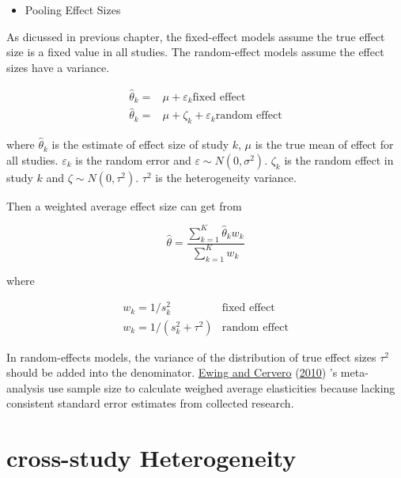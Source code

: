 \documentclass[
  11pt,
  openany]{memoir}
\providecommand{\tightlist}{%
  \setlength{\itemsep}{0pt}\setlength{\parskip}{0pt}}
\begin{document}
\begin{itemize}
\tightlist
\item
  Pooling Effect Sizes
\end{itemize}

As dicussed in previous chapter, the fixed-effect models assume the true effect size is a fixed value in all studies.
The random-effect models assume the effect sizes have a variance.

\begin{equation}
\begin{split}
\hat\theta_k =& \mu  + \varepsilon_k \text{fixed effect}\\
\hat\theta_k =& \mu + \zeta_k + \varepsilon_k \text{random effect}
\end{split}
\label{eq:fixran}
\end{equation}

where \(\hat\theta_k\) is the estimate of effect size of study \(k\), \(\mu\) is the true mean of effect for all studies. \(\varepsilon_k\) is the random error and \(\varepsilon\sim N(0,\sigma^2)\).
\(\zeta_k\) is the random effect in study \(k\) and \(\zeta\sim N(0,\tau^2)\). \(\tau^2\) is the heterogeneity variance.

Then a weighted average effect size can get from

\begin{equation}
\hat\theta = \frac{\sum^{K}_{k=1} \hat\theta_kw_k}{\sum^{K}_{k=1} w_k}
\end{equation}

where

\begin{equation}
\begin{split}
w_k = 1/s^2_k &\text{fixed effect}\\
w_k = 1/(s^2_k+\tau^2) &\text{random effect}
\end{split}
\label{eq:weight}
\end{equation}

In random-effects models, the variance of the distribution of true effect sizes \(\tau^2\) should be added into the denominator.
\protect\hyperlink{ref-ewingTravelBuiltEnvironment2010}{Ewing and Cervero} (\protect\hyperlink{ref-ewingTravelBuiltEnvironment2010}{2010}) 's meta-analysis use sample size to calculate weighed average elasticities because lacking consistent standard error estimates from collected research.

\hypertarget{cross-study-heterogeneity}{%
\section{cross-study Heterogeneity}\label{cross-study-heterogeneity}}
\end{document}
